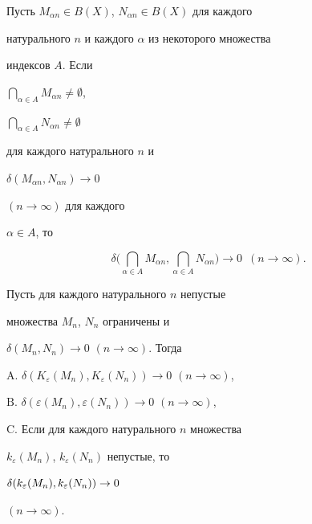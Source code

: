 \begin{lem}


Пусть $M_{\alpha n} \in B(X)$, $N_{\alpha n} \in B(X)$ для каждого 


натурального $n$ и каждого $\alpha $ из некоторого множества


индексов $A$. Если


$\bigcap\limits_{\alpha \in A}M_{\alpha n}\neq \emptyset$,


$\bigcap \limits_{\alpha \in A}N_{\alpha n}\neq \emptyset$


для каждого натурального $n$ и


$\delta (M_{\alpha n},N_{\alpha n}) \to 0$


$(n \to \infty)$ для каждого


$\alpha \in A$, то


$$


\delta \Big(\bigcap\limits_{\alpha \in A}M_{\alpha n},


\bigcap \limits_{\alpha \in A}N_{\alpha n}\Big) \to 0


\ \; (n \to \infty ).


$$


\end{lem}





\begin{thmnonum}


Пусть для каждого натурального $n$ непустые


множества $M_{n}$, $N_{n}$ ограничены и 


$\delta (M_{n},N_{n}) \to 0$ $(n \to \infty)$. Тогда





$\mathrm A.$ $\delta (K_{\varepsilon }(M_{n}),K_{\varepsilon }(N_{n}))


\to 0$ $(n \to \infty)$,





$\mathrm B.$ $\delta (\varepsilon (M_{n}),\varepsilon (N_{n}))


\to 0$ $(n \to \infty )$,





$\mathrm C.$ Если для каждого натурального $n$ множества 


$k_{\varepsilon }(M_{n})$, $k_{\varepsilon }(N_{n})$ непустые, то 


$\delta (k_{\varepsilon }(M_{n}),\linebreak k_{\varepsilon }(N_{n})) \to 0$


$(n \to \infty) $.


\end{thmnonum}





